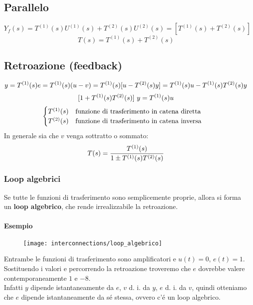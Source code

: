 \documentclass[../main.tex]{subfiles}
\begin{document}
	\subsection{Parallelo}
	\[ Y_f(s) = T^{(1)}(s)U^{(1)}(s) + T^{(2)}(s)U^{(2)}(s) = \left[ T^{(1)}(s) + T^{(2)}(s) \right] \]
	\[ T(s) = T^{(1)}(s) + T^{(2)}(s) \]
	\subsection{Retroazione (feedback)}
	\[ y= T^{(1)}(s)e = T^{(1)}(s)(u-v) = T^{(1)}(s)[u-T^{(2)}(s)y] = T^{(1)}(s)u - T^{(1)}(s)T^{(2)}(s)y \]
	\[ [1+T^{(1)}(s)T^{(2)}(s)]\ y = T^{(1)}(s)u \]
	\[ \begin{cases}
		T^{(1)}(s) \quad \text{funzione di trasferimento in catena diretta}\\
		T^{(2)}(s) \quad \text{funzione di trasferimento in catena inversa}
	\end{cases} \]
	In generale sia che $ v $ venga sottratto o sommato:
	\[ T(s) = \frac{T^{(1)}(s)}{1\pm T^{(1)}(s)T^{(2)}(s)} \]
	\subsubsection{Loop algebrici}
	Se tutte le funzioni di trasferimento sono semplicemente proprie, allora si forma un \textbf{loop algebrico}, che rende irrealizzabile la retroazione.
	\paragraph{Esempio}
	\begin{wrapfigure}{R}{.5\linewidth}%
		\centering
		\texttt{[image: interconnections/loop\_algebrico]}%
	\end{wrapfigure}
	\leavevmode%
	Entrambe le funzioni di trasferimento sono amplificatori e $ u(t) = 0 $, $ e(t) =1 $.\\
	Sostituendo i valori e percorrendo la retroazione troveremo che $ e $ dovrebbe valere contemporaneamente $ 1 $ e $ -8 $.\\
	Infatti $ y $ dipende istantaneamente da $ e $, $ v $ d. i. da $ y $, $ e $ d. i. da $ v $, quindi otteniamo che $ e $ dipende istantaneamente da s\'e stessa, ovvero c'\'e un loop algebrico.
\end{document}
